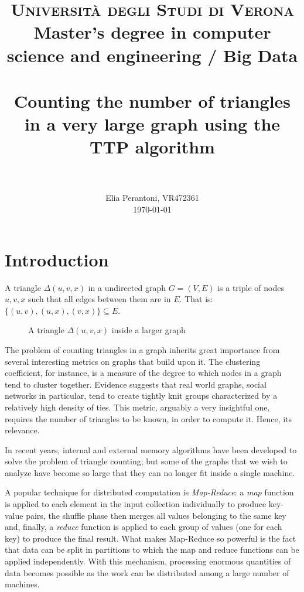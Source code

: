 \documentclass[paper=a4, fontsize=11pt]{scrartcl}
\title{
    \usefont{OT1}{bch}{b}{n}
    \normalfont \normalsize \textsc{Università degli Studi di Verona} \\ [15pt]
    Master's degree in computer science and engineering / Big Data \\ [15pt]
    \horrule{0.5pt} \\[0.4cm]
    \huge Counting the number of triangles in a very large graph using the TTP algorithm \\
    \horrule{2pt} \\[0.5cm]
}
\author{
    \normalfont \normalsize
    Elia Perantoni, VR472361
    \\[-3pt] \normalsize \today
}
\date{}
\begin{document}
\maketitle
\section{Introduction}
A triangle $\Delta(u, v, x)$ in a undirected graph $G=(V, E)$ is a triple of
nodes $u, v, x$ such that all edges between them are in $E$. That is: $\{(u,v),
(u,x), (v, x)\}\subseteq E$.

\begin{figure}[htb]
    \centering
    \caption{A triangle $\Delta(u, v, x)$ inside a larger graph}
\end{figure}

The problem of counting triangles in a graph inherits great importance from
several interesting metrics on graphs that build upon it. The clustering
coefficient, for instance, is a measure of the degree to which nodes in a graph
tend to cluster together. Evidence suggests that real world graphs, social
networks in particular, tend to create tightly knit groups characterized by a
relatively high density of ties. This metric, arguably a very insightful one,
requires the number of triangles to be known, in order to compute it. Hence, its
relevance.

In recent years, internal and external memory algorithms have been developed to
solve the problem of triangle counting; but some of the graphs that we wish to
analyze have become so large that they can no longer fit inside a single
machine.

A popular technique for distributed computation is \emph{Map-Reduce}: a
\emph{map} function is applied to each element in the input collection
individually to produce key-value pairs, the shuffle phase then merges all
values belonging to the same key and, finally, a \emph{reduce} function is
applied to each group of values (one for each key) to produce the final result.
What makes Map-Reduce so powerful is the fact that data can be split in
partitions to which the map and reduce functions can be applied independently.
With this mechanism, processing enormous quantities of data becomes possible as
the work can be distributed among a large number of machines.
\end{document}
